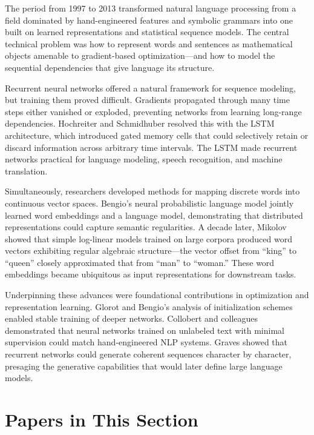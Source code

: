 
The period from 1997 to 2013 transformed natural language processing from a field dominated by hand-engineered features and symbolic grammars into one built on learned representations and statistical sequence models. The central technical problem was how to represent words and sentences as mathematical objects amenable to gradient-based optimization---and how to model the sequential dependencies that give language its structure.

Recurrent neural networks offered a natural framework for sequence modeling, but training them proved difficult. Gradients propagated through many time steps either vanished or exploded, preventing networks from learning long-range dependencies. Hochreiter and Schmidhuber resolved this with the LSTM architecture, which introduced gated memory cells that could selectively retain or discard information across arbitrary time intervals. The LSTM made recurrent networks practical for language modeling, speech recognition, and machine translation.

Simultaneously, researchers developed methods for mapping discrete words into continuous vector spaces. Bengio's neural probabilistic language model jointly learned word embeddings and a language model, demonstrating that distributed representations could capture semantic regularities. A decade later, Mikolov showed that simple log-linear models trained on large corpora produced word vectors exhibiting regular algebraic structure---the vector offset from ``king'' to ``queen'' closely approximated that from ``man'' to ``woman.'' These word embeddings became ubiquitous as input representations for downstream tasks.

Underpinning these advances were foundational contributions in optimization and representation learning. Glorot and Bengio's analysis of initialization schemes enabled stable training of deeper networks. Collobert and colleagues demonstrated that neural networks trained on unlabeled text with minimal supervision could match hand-engineered NLP systems. Graves showed that recurrent networks could generate coherent sequences character by character, presaging the generative capabilities that would later define large language models.

\section*{Papers in This Section}

